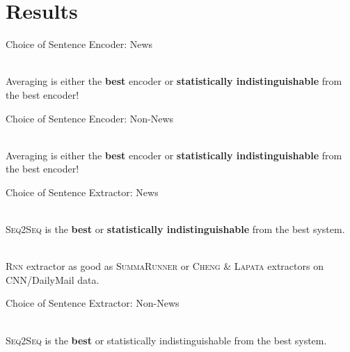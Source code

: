 \section{Results}


\begin{frame}{Choice of Sentence \alert{Enc}oder: News}
  \begin{center}
      
  \end{center}
  ~\\

  Averaging is either the \alert{\textbf{best}} encoder or 
  \textbf{statistically indistinguishable} from the best encoder!

\end{frame}

\begin{frame}{Choice of Sentence \alert{Enc}oder: Non-News}
  \begin{center}
        
  \end{center}
  ~\\

  Averaging is either the \alert{\textbf{best}} encoder or 
  \textbf{statistically indistinguishable} from the best encoder!
\end{frame}

\begin{frame}{Choice of Sentence \alert{Ext}ractor: News}
    
 \begin{center}
   
 \end{center}
 
 ~\\

 \textsc{Seq2Seq} is the \alert{\textbf{best}} or \textbf{statistically 
 indistinguishable} from the best system.

 ~\\
 \textsc{Rnn} extractor as good as \textsc{SummaRunner} or 
 \textsc{Cheng \& Lapata} extractors on CNN/DailyMail data.

  

\end{frame}

\begin{frame}{Choice of Sentence \alert{Ext}ractor: Non-News}
    
 \begin{center}
   
 \end{center}

 ~\\

 \textsc{Seq2Seq} is the \alert{\textbf{best}} or statistically indistinguishable from the best
 system.


\end{frame}



